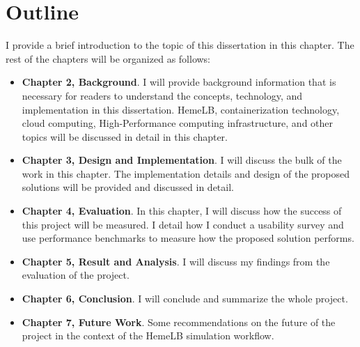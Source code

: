 \section{Outline}
I provide a brief introduction to the topic of this dissertation in this chapter. The rest of the chapters will be organized as follows:
\begin{itemize}
    \item \textbf{Chapter 2, Background}. I will provide background information that is necessary for readers to understand the concepts, technology, and implementation in this dissertation. HemeLB, containerization technology, cloud computing, High-Performance computing infrastructure, and other topics will be discussed in detail in this chapter.
    \item \textbf{Chapter 3, Design and Implementation}. I will discuss the bulk of the work in this chapter. The implementation details and design of the proposed solutions will be provided and discussed in detail.
    \item \textbf{Chapter 4, Evaluation}. In this chapter, I will discuss how the success of this project will be measured. I detail how I conduct a usability survey and use performance benchmarks to measure how the proposed solution performs.
    \item \textbf{Chapter 5, Result and Analysis}. I will discuss my findings from the evaluation of the project. 
    \item \textbf{Chapter 6, Conclusion}. I will conclude and summarize the whole project.
    \item \textbf{Chapter 7, Future Work}. Some recommendations on the future of the project in the context of the HemeLB simulation workflow.
\end{itemize}
